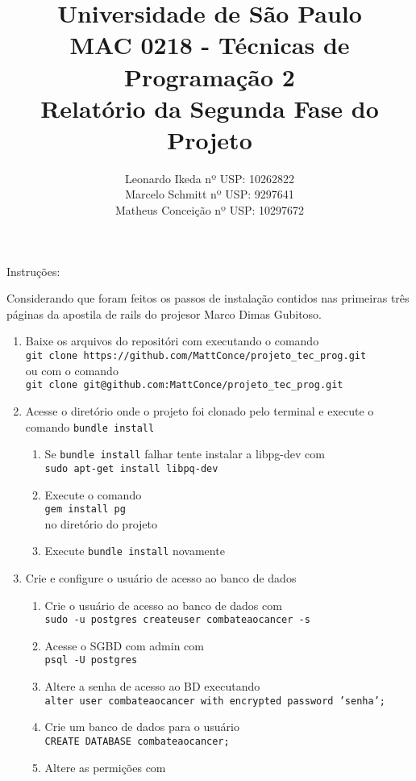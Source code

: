 \documentclass[12pt,a4paper]{article}
\title{{\bf Universidade de São Paulo} \\MAC 0218 - Técnicas de Programação 2 \\ Relatório da Segunda Fase do Projeto}
\author{Leonardo Ikeda     nº USP: 10262822 \\
	    Marcelo Schmitt    nº USP: 9297641\\
	    Matheus Conceição  nº USP: 10297672}
\begin{document}
\date{}
\maketitle

Instruções:

Considerando que foram feitos os passos de instalação contidos nas primeiras três páginas da apostila de rails do projesor Marco Dimas Gubitoso.

\begin{enumerate}
	\item Baixe os arquivos do repositóri com executando o comando\\ \texttt{git clone https://github.com/MattConce/projeto\_tec\_prog.git}\\ ou com o comando\\ \texttt{git clone git@github.com:MattConce/projeto\_tec\_prog.git} \\
	\item Acesse o diretório onde o projeto foi clonado pelo terminal e execute o comando \texttt{bundle install}
	\begin{enumerate}
		\item Se \texttt{bundle install} falhar tente instalar a libpg-dev com \\ \texttt{sudo apt-get install libpq-dev}
		\item Execute o comando \\
		\texttt{gem install pg} \\
		no diretório do projeto
		\item Execute \texttt{bundle install} novamente
	\end{enumerate}
	\item Crie e configure o usuário de acesso ao banco de dados
	\begin{enumerate}
		\item Crie o usuário de acesso ao banco de dados com  \\
		\texttt{sudo -u postgres createuser combateaocancer -s}
		\item Acesse o SGBD com admin com \\
		\texttt{psql -U postgres}
		\item Altere a senha de acesso ao BD executando \\
		\texttt{alter user combateaocancer with encrypted password 'senha';}
		\item Crie um banco de dados para o usuário \\
		\texttt{CREATE DATABASE combateaocancer;}
		\item Altere as permições com\\

\end{enumerate}
\end{enumerate}
\end{document}
